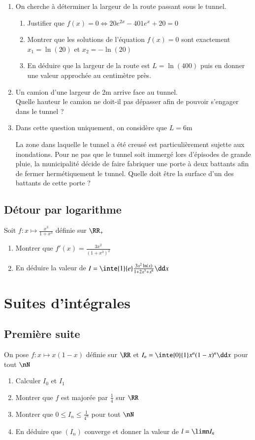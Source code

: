 \documentclass[oneside,12pt]{article}          %
\begin{document}
\begin{enumerate}
	\item On cherche à déterminer la largeur de la route passant sous le tunnel.
	\begin{enumerate}
		\item Justifier que $f(x)=0\Longleftrightarrow 20e^{2x}-401e^x+20=0$
		\item Montrer que les solutions de l'équation $f(x)=0$ sont exactement $x_1=\ln(20)$ et $x_2=-\ln(20)$
		\item En déduire que la largeur de la route est $L=\ln(400)$ puis en donner une valeur approchée au centimètre près.
	\end{enumerate}
	\item Un camion d'une largeur de 2m arrive face au tunnel.\\    
           Quelle hauteur le camion ne doit-il pas dépasser afin de pouvoir s'engager dans le tunnel ?
	\item Dans cette question uniquement, on considère que $L=6$m
	
	La zone dans laquelle le tunnel a été creusé est particulièrement sujette aux inondations. Pour ne pas 			que le tunnel soit immergé lors d'épisodes de grande pluie, la municipalité décide de faire fabriquer 			une porte à deux battants afin de fermer hermétiquement le tunnel.
	Quelle doit être la surface d'un des battants de cette porte ?
\end{enumerate}



\subsection{Détour par logarithme}
Soit $f:x\mapsto\frac{x^3}{1+x^3}$ définie sur $\RR_+$
\begin{enumerate}
    \item Montrer que $f'(x)=\frac{3x^2}{(1+x^3)^2}$
    \item En déduire la valeur de $I=\inte{1}{e}\frac{3x^2\ln(x)}{1+2x^3+x^6}\dd x$
\end{enumerate}



\section{Suites d'intégrales}

\subsection{Première suite}
On pose $f:x\mapsto x(1-x)$ définie sur $\RR$ et $I_n=\inte{0}{1}x^n(1-x)^n\dd x$ pour tout $\nN$
\begin{enumerate}
    \item Calculer $I_0$ et $I_1$
    \item Montrer que $f$ est majorée par $\frac{1}{4}$ sur $\RR$
    \item Montrer que $0\leq I_n\leq\frac{1}{4^n}$ pour tout $\nN$
    \item En déduire que $(I_n)$ converge et donner la valeur de $l=\limn I_n$
\end{enumerate}
\end{document}

